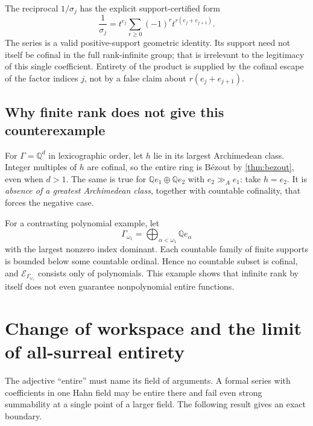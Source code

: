 \documentclass[11pt]{article}
\theoremstyle{plain}
\theoremstyle{plain}
\theoremstyle{plain}
\theoremstyle{definition}
\theoremstyle{definition}
\theoremstyle{definition}
\theoremstyle{remark}
\newcommand{\Q}{\mathbb Q}\newcommand{\Z}{\mathbb Z}\newcommand{\N}{\mathbb N}
\newcommand{\ggA}{\mathrel{\gg_{\!A}}}
\begin{document}
The reciprocal $1/\sigma_j$ has the explicit support-certified form
\[
 \frac1{\sigma_j}
   =t^{e_j}\sum_{r\ge0}(-1)^r t^{r(e_j+e_{j+1})}.
\]
The series is a valid positive-support geometric identity. Its support
need not itself be cofinal in the full rank-infinite group; that is
irrelevant to the legitimacy of this single coefficient. Entirety of
the product is supplied by the cofinal escape of the factor indices
$j$, not by a false claim about $r(e_j+e_{j+1})$.

\subsection{Why finite rank does not give this counterexample}
For $\Gamma=\Q^d$ in lexicographic order, let $h$ lie in its largest
Archimedean class. Integer multiples of $h$ are cofinal, so the entire
ring is B\'ezout by \cref{thm:bezout}, even when $d>1$. The same is
true for $\Q e_1\oplus\Q e_2$ with $e_2\ggA e_1$: take $h=e_2$.
It is \emph{absence of a greatest Archimedean class}, together with
countable cofinality, that forces the negative case.

For a contrasting polynomial example, let
\[
 \Gamma_{\omega_1}=\bigoplus_{\alpha<\omega_1}\Q e_\alpha
\]
with the largest nonzero index dominant. Each countable family of
finite supports is bounded below some countable ordinal. Hence no
countable subset is cofinal, and $\mathcal E_{\Gamma_{\omega_1}}$
consists only of polynomials. This example shows that infinite rank
by itself does not even guarantee nonpolynomial entire functions.

\section{Change of workspace and the limit of all-surreal entirety}
\label{sec:extension}

The adjective ``entire'' must name its field of arguments. A formal
series with coefficients in one Hahn field may be entire there and
fail even strong summability at a single point of a larger field.
The following result gives an exact boundary.
\end{document}
